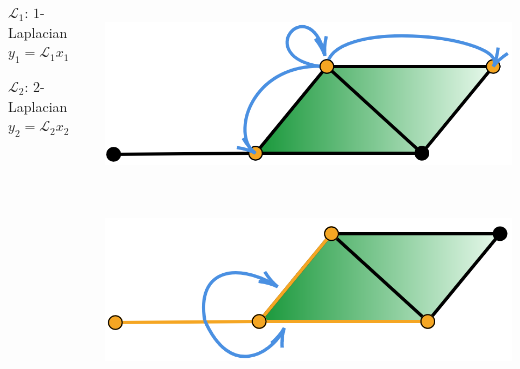 \documentclass[landscape,a0paper,blockverticalspace = 7mm]{tikzposter}
\begin{document}
\begin{columns}
{{\begin{center}
\begin{minipage}{0.2\linewidth}
      \end{minipage}\hspace{4.5cm}
      \begin{minipage}{0.2\linewidth}
         \begin{center}
		  $\mathcal{L_1}$: $1$-Laplacian\\
		$y_1=\mathcal{L_1}x_1$
	\end{center}
      \end{minipage} \hspace{4.5cm}
	\begin{minipage}{0.2\linewidth}
         \begin{center}
		 $\mathcal{L_2}$: $2$-Laplacian\\
		$y_2=\mathcal{L_2}x_2$
	\end{center}
      \end{minipage} 
      
      \end{center}
      
\begin{center}
		 \begin{minipage}{0.2\linewidth}
		 \begin{center}
		
          \includegraphics[height=4.8cm]{figures/glap0.png}

          \vspace{1cm}
        
          \end{center}
      \end{minipage} \hspace{3.6cm}
      \begin{minipage}{0.2\linewidth}
      \begin{center}
     	\vspace{1.5cm}
          \includegraphics[height=4.58cm]{figures/glap1.png}
          

\end{center}
\end{minipage}
\end{center}}}
\end{columns}
\end{document}
